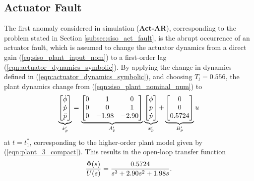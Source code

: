 \subsection{Actuator Fault}\label{subsec:siso_act_sims}
The first anomaly considered in simulation (\textbf{Act-AR}), corresponding to the problem stated in Section \ref{subsec:siso_act_fault}, is the abrupt occurrence of an actuator fault, which is assumed to change the actuator dynamics from a direct gain (\ref{eq:siso_plant_input_nom}) to a first-order lag (\ref{eqn:actuator_dynamics_symbolic}). By applying the change in dynamics defined in (\ref{eqn:actuator_dynamics_symbolic}), and choosing $T_l = 0.556$, the plant dynamics change from (\ref{eqn:siso_plant_nominal_num}) to
\begin{equation}
	\underbrace{\begin{bmatrix}
			\dot{\phi} \\ \dot{p} \\ \ddot{p}
		\end{bmatrix}}_{\dot{x}_p'} = \underbrace{\begin{bmatrix}
		0 & \hfil 1 & \hfil 0\\ 0 & \hfil 0 & \hfil 1 \\ 0 & -1.98 & -2.90
	\end{bmatrix}}_{A_p'} \underbrace{\begin{bmatrix}
			\phi \\ p \\ \dot{p}
		\end{bmatrix}}_{x_p'} + \underbrace{\begin{bmatrix}
		0 \\ 0 \\ 0.5724
	\end{bmatrix}}_{B_p'} u
	\label{eqn:plant_3}
\end{equation}
\noindent at $t = t_1^*$, corresponding to the higher-order plant model given by (\ref{eqn:plant_3_compact}). This results in the open-loop transfer function
\begin{equation}
		\frac{\Phi(s)}{U(s)} = \frac{0.5724}{s^3 + 2.90s^2 + 1.98s}.\\
\end{equation}

